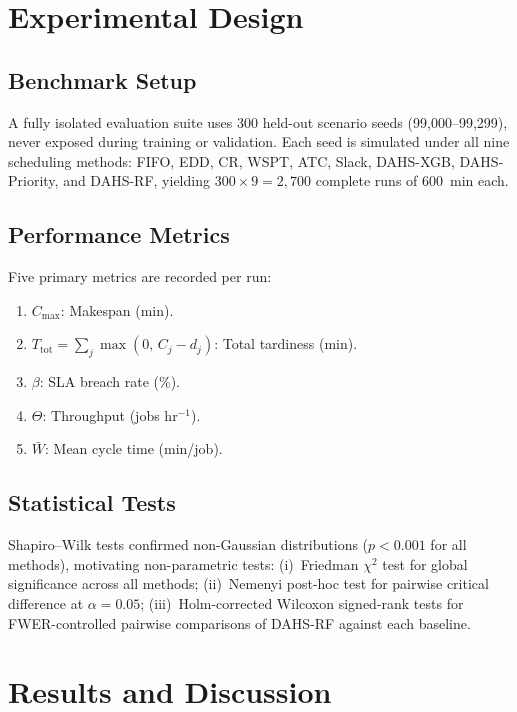 \documentclass[3p,times]{elsarticle}
\begin{document}
\section{Experimental Design}
\label{sec:exp}

\subsection{Benchmark Setup}

A fully isolated evaluation suite uses 300 held-out scenario seeds
(99{,}000--99{,}299), never exposed during training or validation.
Each seed is simulated under all nine scheduling methods: FIFO,
EDD, CR, WSPT, ATC, Slack, DAHS-XGB, DAHS-Priority, and DAHS-RF,
yielding $300\times9=2{,}700$ complete runs of 600~min each.

\subsection{Performance Metrics}

Five primary metrics are recorded per run:
\begin{enumerate}
  \item $C_{\max}$: Makespan (min).
  \item $T_{\mathrm{tot}}=\sum_{j}\max(0,\,C_{j}-d_{j})$:
        Total tardiness (min).
  \item $\beta$: SLA breach rate (\%).
  \item $\Theta$: Throughput (jobs hr$^{-1}$).
  \item $\bar{W}$: Mean cycle time (min/job).
\end{enumerate}

\subsection{Statistical Tests}

Shapiro--Wilk tests confirmed non-Gaussian distributions
($p<0.001$ for all methods), motivating non-parametric tests:
(i)~Friedman $\chi^{2}$ test for global significance across all
methods; (ii)~Nemenyi post-hoc test for pairwise critical
difference at $\alpha=0.05$; (iii)~Holm-corrected Wilcoxon
signed-rank tests for FWER-controlled pairwise comparisons of
DAHS-RF against each baseline.

\section{Results and Discussion}
\label{sec:results}
\end{document}
